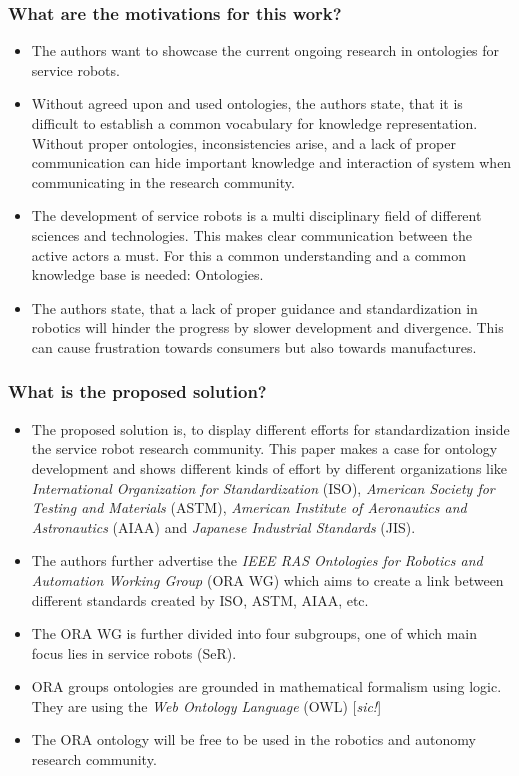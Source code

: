     \subsubsection*{What are the motivations for this work?}
    \begin{itemize}
        \item The authors want to showcase the current ongoing research in ontologies for service robots. 
        \item Without agreed upon and used ontologies, the authors state, that it is difficult to establish a common vocabulary for knowledge representation. Without proper ontologies, inconsistencies arise, and a lack of proper communication can hide important knowledge and interaction of system when communicating in the research community.
        \item The development of service robots is a multi disciplinary field of different sciences and technologies. This makes clear communication between the active actors a must. For this a common understanding and a common knowledge base is needed: Ontologies.
        \item The authors state, that a lack of proper guidance and standardization in robotics will hinder the progress by slower development and divergence. This can cause frustration towards consumers but also towards manufactures.
    \end{itemize}
    \subsubsection*{What is the proposed solution?}
    \begin{itemize}
        \item The proposed solution is, to display different efforts for standardization inside the service robot research community. This paper makes a case for ontology development and shows different kinds of effort by different organizations like \emph{International Organization for Standardization} (ISO), \emph{American Society for Testing and Materials} (ASTM), \emph{American Institute of Aeronautics and Astronautics} (AIAA) and \emph{Japanese Industrial Standards} (JIS). 
        \item The authors further advertise the \emph{IEEE RAS Ontologies for Robotics and Automation Working Group} (ORA WG) which aims to create a link between different standards created by ISO, ASTM, AIAA, etc.
        \item The ORA WG is further divided into four subgroups, one of which main focus lies in service robots (SeR).
        \item ORA groups ontologies are grounded in mathematical formalism using logic. They are using the \emph{Web Ontology Language} (OWL) [\emph{sic!}]
        \item The ORA ontology will be free to be used in the robotics and autonomy research community.
    \end{itemize}
